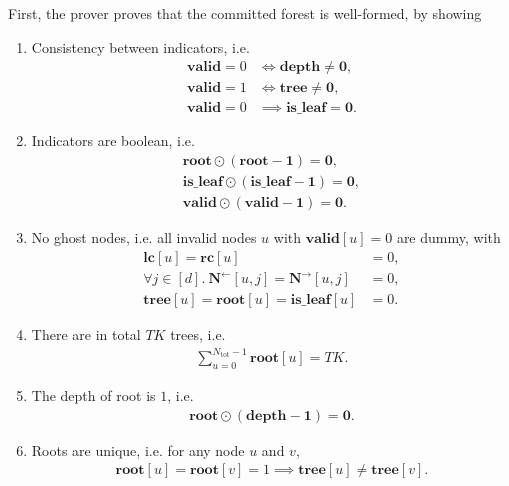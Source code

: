 First, the prover proves that the committed forest is well-formed, by showing
\begin{enumerate}
  \item Consistency between indicators, i.e.
  \begin{align}
    \mathbf{valid}=0 &\iff \mathbf{depth} \neq \mathbf{0},\\
    \mathbf{valid}=1 &\iff \mathbf{tree} \neq \mathbf{0},\\
    \mathbf{valid}=0 &\implies \mathbf{is\_leaf} = \mathbf{0}.
  \end{align}

  \item Indicators are boolean, i.e.
  \begin{align}
    \mathbf{root}\odot(\mathbf{root}-\mathbf{1}) = \mathbf{0},\\
    \mathbf{is\_leaf}\odot(\mathbf{is\_leaf}-\mathbf{1}) = \mathbf{0},\\
    \mathbf{valid}\odot(\mathbf{valid}-\mathbf{1}) = \mathbf{0}.
  \end{align}

  \item No ghost nodes, i.e. all invalid nodes $u$ with $\mathbf{valid}[u]=0$ are dummy, with
    \begin{align}
    \mathbf{lc}[u] = \mathbf{rc}[u] &= 0,\\
    \forall j\in [d].\ \mathbf{N}^{\leftarrow}[u, j] = \mathbf{N}^{\rightarrow}[u, j] &= 0,\\
    \mathbf{tree}[u] = \mathbf{root}[u] = \mathbf{is\_leaf}[u] &= 0.
    \end{align}

  \item There are in total $TK$ trees, i.e.
  \begin{align}
    \sum_{u=0}^{N_{\mathrm{tot}}-1} \mathbf{root}[u] = TK.
  \end{align}

  \item The depth of root is $1$, i.e.
  \begin{align}
    \mathbf{root}\odot (\mathbf{depth}-\mathbf{1}) = \mathbf{0}.
  \end{align}

  \item Roots are unique, i.e. for any node $u$ and $v$,
  \begin{align}
    \mathbf{root}[u] = \mathbf{root}[v] = 1\implies \mathbf{tree}[u]\neq \mathbf{tree}[v].
  \end{align}


\end{enumerate}
